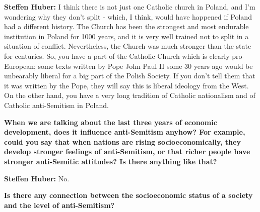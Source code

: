 \textbf{Steffen Huber:} I think there is not just one Catholic church in Poland, and I'm wondering why they don't split - which, I think, would have happened if Poland had a different history. The Church has been the strongest and most endurable institution in Poland for 1000 years, and it is very well trained not to split in a situation of conflict. Nevertheless, the Church was much stronger than the state for centuries. So, you have a part of the Catholic Church which is clearly pro-European; some texts written by Pope John Paul II some 30 years ago would be unbearably liberal for a big part of the Polish Society. If you don't tell them that it was written by the Pope, they will say this is liberal ideology from the West. On the other hand, you have a very long tradition of Catholic nationalism and of Catholic anti-Semitism in Poland. 

\textbf{When we are talking about the last three years of economic development, does it influence anti-Semitism anyhow?  For example, could you say that when nations are rising socioeconomically, they develop stronger feelings of anti-Semitism, or that richer people have stronger anti-Semitic attitudes? Is there anything like that?} 

\textbf{Steffen Huber:} No. 

\textbf{Is there any connection between the socioeconomic status of a society and the level of anti-Semitism?} 

